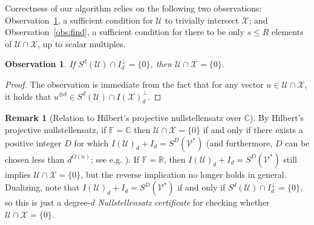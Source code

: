 \documentclass[11pt]{article}
\newtheorem{obs}[theorem]{Observation}
\theoremstyle{definition}
\newtheorem{remark}[theorem]{Remark}
\newcommand{\complex}{\mathbb{C}}
\newcommand{\field}{\mathbb{F}}
\newcommand{\real}{\mathbb{R}}
\newcommand\X{\mathcal{X}}
\newcommand\V{\mathcal{V}}
\newcommand\U{\mathcal{U}}
\DeclareMathOperator{\spn}{span}
\newcommand{\bnote}[1]{}
\def\ba#1\ea{\begin{align}#1\end{align}}
\begin{document}
Correctness of our algorithm relies on the following two observations: Observation~\ref{obs:cert}, a sufficient condition for $\U$ to trivially intersect $\X$; and Observation~\ref{obs:find}, a sufficient condition for there to be only $s \leq R$ elements of $\U \cap \X$, up to scalar multiples.
\begin{obs}\label{obs:cert}
If $S^d(\U) \cap I_d^{\perp}=\{0\}$, then $\U \cap \X=\{0\}$.
\end{obs}
\begin{proof}
The observation is immediate from the fact that for any vector $u \in \U \cap \X$, it holds that $u^{\otimes d} \in S^d(\U) \cap I(\X)_d^{\perp}$.
\end{proof}

\bnote{Remark added:}
\begin{remark}[Relation to Hilbert's projective nullstellensatz over $\complex$]\label{rmk:nullstellensatz}
By Hilbert's projective nullstellensatz, if $\field=\complex$ then $\U \cap \X=\{0\}$ if and only if there exists a positive integer $D$ for which $I(\U)_d+I_d = S^D(\V^*)$ (and furthermore, $D$ can be chosen less than $d^{O(n)}$; see e.g. \cite{kollar1988sharp}). If $\field=\real$, then $I(\U)_d+I_d = S^D(\V^*)$ still implies $\U \cap \X=\{0\}$, but the reverse implication no longer holds in general. Dualizing, note that $I(\U)_d+I_d = S^D(\V^*)$ if and only if $S^d(\U) \cap I_d^{\perp}=\{0\}$, so this is just a degree-$d$ \textit{Nullstellensatz certificate} for checking whether $\U\cap \X=\{0\}$.
\end{remark}
\end{document}
